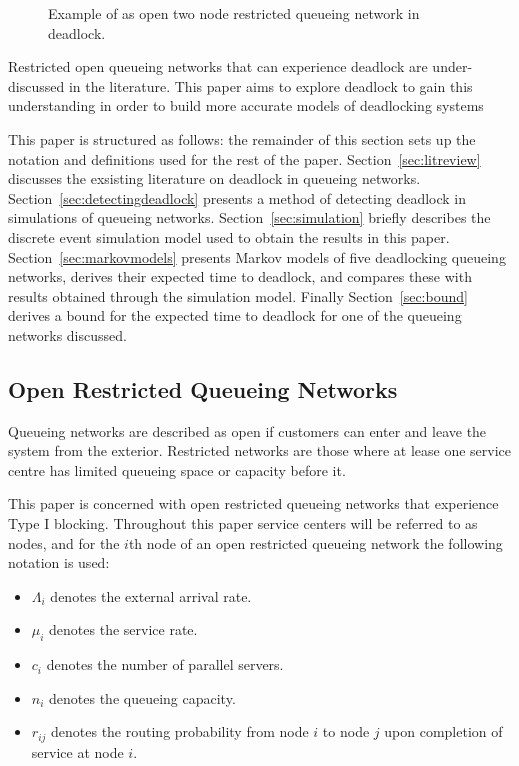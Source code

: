 \documentclass{article}
\numberwithin{equation}{section}
\begin{document}
\begin{figure}[!htbp]
  \begin{center}
  
  \end{center}
  \caption{Example of as open two node restricted queueing network in deadlock.}
  \label{fig:1st_example}
\end{figure}

Restricted open queueing networks that can experience deadlock are under-discussed in the literature.
This paper aims to explore deadlock to gain this understanding in order to build more accurate models of deadlocking systems

This paper is structured as follows: the remainder of this section sets up the notation and definitions used for the rest of the paper. Section~\ref{sec:litreview} discusses the exsisting literature on deadlock in queueing networks. Section~\ref{sec:detectingdeadlock} presents a method of detecting deadlock in simulations of queueing networks. Section~\ref{sec:simulation} briefly describes the discrete event simulation model used to obtain the results in this paper. Section~\ref{sec:markovmodels} presents Markov models of five deadlocking queueing networks, derives their expected time to deadlock, and compares these with results obtained through the simulation model. Finally Section~\ref{sec:bound} derives a bound for the expected time to deadlock for one of the queueing networks discussed.

\subsection{Open Restricted Queueing Networks}

Queueing networks are described as open if customers can enter and leave the system from the exterior.
Restricted networks are those where at lease one service centre has limited queueing space or capacity before it.

This paper is concerned with open restricted queueing networks that experience Type I blocking.
Throughout this paper service centers will be referred to as nodes, and for the $i$th node of an open restricted queueing network the following notation is used:

\begin{itemize}
  \item $\Lambda_i$ denotes the external arrival rate.
  \item $\mu_i$ denotes the service rate.
  \item $c_i$ denotes the number of parallel servers.
  \item $n_i$ denotes the queueing capacity.
  \item $r_{ij}$ denotes the routing probability from node $i$ to node $j$ upon completion of service at node $i$.
\end{itemize}
\end{document}
